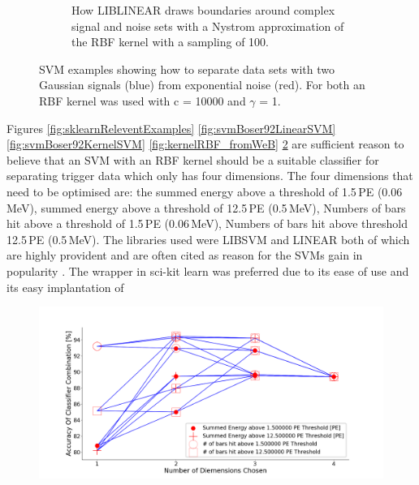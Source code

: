 \begin{figure}[H]
\begin{subfigure}{.5\textwidth}
  \captionsetup{width=.9\linewidth}
  \caption{How LIBLINEAR draws boundaries around complex signal and noise sets with a Nystrom approximation of the RBF kernel with a sampling of 100.}
  \label{subFig:exp_2NysGaussExample}
\end{subfigure}
\caption{SVM examples showing how to separate data sets with two Gaussian signals (blue) from exponential noise (red). For both an RBF kernel was used with c = 10000 and $\gamma$ = 1.}
\label{fig:svmExp_GausseExamples}
\end{figure}

Figures \ref{fig:sklearnReleventExamples} \ref{fig:svmBoser92LinearSVM} \ref{fig:svmBoser92KernelSVM} \ref{fig:kernelRBF_fromWeB} \ref{fig:svmExp_GausseExamples} are sufficient reason to believe that an SVM with an RBF kernel should be a suitable classifier for separating trigger data which only has four dimensions. The four dimensions that need to be optimised are: the summed energy above a threshold of 1.5\,PE (0.06\,MeV), summed energy above a threshold of 12.5\,PE (0.5\,MeV), Numbers of bars hit above a threshold of 1.5\,PE (0.06\,MeV), Numbers of bars hit above threshold 12.5\,PE (0.5\,MeV). The libraries used were LIBSVM and LINEAR both of which are highly provident and are often cited as reason for the SVMs gain in popularity \cite{chang2011libsvm} \cite{fan2008liblinear} \cite{murty2016support}. The wrapper in sci-kit learn was preferred due to its ease of use and its easy implantation of 
  
\begin{figure}[H]
\centering
\includegraphics[width=\linewidth]{Chapter4/Figs/Raster/svmLinAndRbf/accNeutronRbfSVMg0.01.png}
\label{fig:accNeutronRbfSVMg0.01}
\end{figure}

